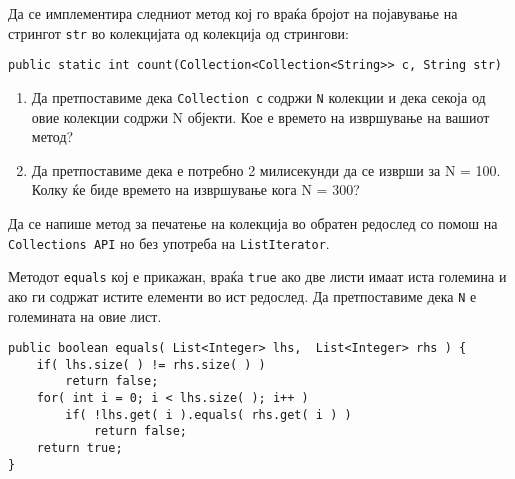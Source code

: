 

\lfoot{}
\cfoot{\thepage}
\rfoot{}
\usepackage{fancyvrb}
\usepackage{xcolor}
\usepackage{textcomp}


\begin{questions}


\renewcommand{\theenumi}{\alph{enumi}}

\question
Да се имплементира следниот метод кој го враќа бројот на појавување на стрингот
\texttt{str} во колекцијата од колекција од стрингови: 
\begin{lstlisting}
public static int count(Collection<Collection<String>> c, String str)
\end{lstlisting}
\begin{enumerate}
  \item Да претпоставиме дека \texttt{Collection c} содржи  \texttt{N} колекции
  и дека секоја од овие колекции содржи N објекти. Кое е времето на извршување
  на вашиот метод?
  \item Да претпоставиме дека е потребно 2 милисекунди да се изврши за N = 100.
  Колку ќе биде времето на извршување кога N = 300?
\end{enumerate}



\question

Да се напише метод за печатење на колекција во обратен редослед со помош на
\texttt{Collections API} но без употреба на \texttt{ListIterator}.



\question

Методот \texttt{equals} кој е прикажан, враќа \texttt{true} ако две листи имаат
иста големина и ако ги содржат истите елементи во ист редослед. Да
претпоставиме дека \texttt{N} е големината на овие лист.
\begin{lstlisting}
public boolean equals( List<Integer> lhs,  List<Integer> rhs ) {
    if( lhs.size( ) != rhs.size( ) )
        return false;
    for( int i = 0; i < lhs.size( ); i++ )
        if( !lhs.get( i ).equals( rhs.get( i ) )
            return false;
    return true;
}


\end{lstlisting}
\end{questions}
